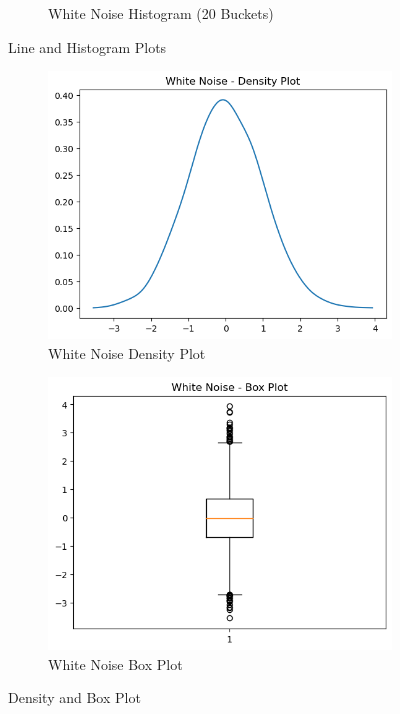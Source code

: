 \documentclass{article}
\begin{document}
\begin{figure}[htbp]
\begin{subfigure}[b]{0.45\textwidth}
    \caption{White Noise Histogram (20 Buckets)}
    \label{fig:whitenoisehist}
  \end{subfigure}
  \caption{Line and Histogram Plots}
  \label{fig:whitenoise1}
\end{figure}
\begin{figure}[htbp]
  \centering
  \begin{subfigure}[b]{0.45\textwidth}
    \includegraphics[width=\textwidth]{img/white_noise/density_plot.png}
    \caption{White Noise Density Plot}
    \label{fig:whitenoisedensity}
  \end{subfigure}
  \hfill
  \begin{subfigure}[b]{0.45\textwidth}
    \includegraphics[width=\textwidth]{img/white_noise/box_plot.png}
    \caption{White Noise Box Plot}
    \label{fig:whitenoisebox}
  \end{subfigure}
  \caption{Density and Box Plot}
  \label{fig:whitenoise2}
\end{figure}
\end{document}
